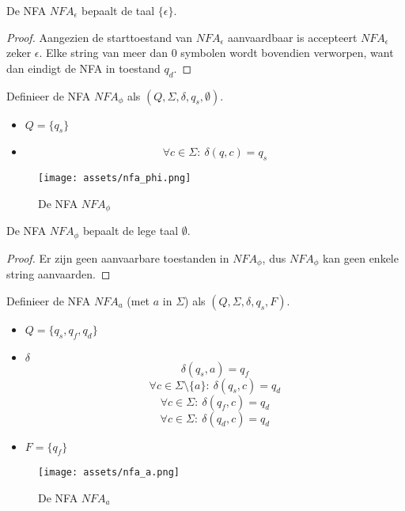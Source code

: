\documentclass[main.tex]{subfiles}
\begin{document}
\begin{ei}
  \label{ei:nfa-epsilon}
  De NFA $NFA_{\epsilon}$ bepaalt de taal $\{ \epsilon \}$.

  \begin{proof}
    Aangezien de starttoestand van $NFA_{\epsilon}$ aanvaardbaar is accepteert $NFA_{\epsilon}$ zeker $\epsilon$.
    Elke string van meer dan $0$ symbolen wordt bovendien verworpen, want dan eindigt de NFA in toestand $q_{d}$.
  \end{proof}
\end{ei}

\begin{de}
  Definieer de NFA $NFA_{\phi}$ als $(Q, \Sigma, \delta, q_{s}, \emptyset)$.

  \begin{itemize}
  \item $Q = \{q_{s}\}$
  \item 
    \[ \forall c \in \Sigma:\ \delta(q,c) = q_{s} \]
  \end{itemize}

  \begin{figure}[H]
    \centering
    \texttt{[image: assets/nfa\_phi.png]}      
    \caption{De NFA $NFA_{\phi}$}
    \label{fig:nfa_phi}
  \end{figure}
\end{de}

\begin{ei}
  \label{ei:nfa-phi}
  De NFA $NFA_{\phi}$ bepaalt de lege taal $\emptyset$.

  \begin{proof}
    Er zijn geen aanvaarbare toestanden in $NFA_{\phi}$, dus $NFA_{\phi}$ kan geen enkele string aanvaarden.
  \end{proof}
\end{ei}

\begin{de}
  Definieer de NFA $NFA_{a}$ (met $a$ in $\Sigma$) als $(Q, \Sigma, \delta, q_{s}, F)$.

  \begin{itemize}
  \item $Q = \{q_{s},q_{f},q_{d}\}$
  \item $\delta$
    \[ \delta(q_{s}, a) = q_{f} \]
    \[ \forall c \in \Sigma\setminus\{a\}:\ \delta(q_{s}, c) = q_{d} \]
    \[ \forall c \in \Sigma:\ \delta(q_{f}, c) = q_{d}\]
    \[ \forall c \in \Sigma:\ \delta(q_{d}, c) = q_{d}\]
  \item $F = \{q_{f}\}$
  \end{itemize}

  \begin{figure}[H]
    \centering
    \texttt{[image: assets/nfa\_a.png]}      
    \caption{De NFA $NFA_{a}$}
    \label{fig:nfa_a}
  \end{figure}
\end{de}
\end{document}

